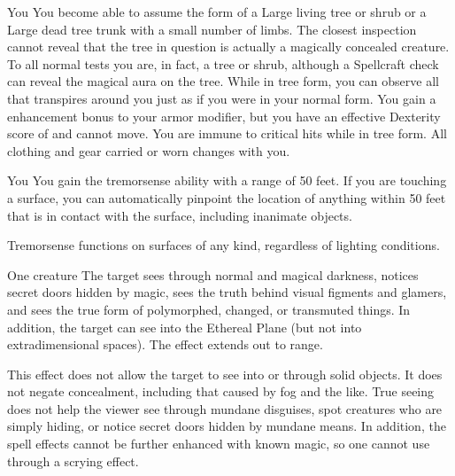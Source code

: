 \spelldur{\durext \dismissable}
\begin{spelltarget}{You}
    \spelleffect You become able to assume the form of a Large living tree or shrub or a Large dead tree trunk with a small number of limbs. The closest inspection cannot reveal that the tree in question is actually a magically concealed creature. To all normal tests you are, in fact, a tree or shrub, although a Spellcraft check can reveal the magical aura on the tree. While in tree form, you can observe all that transpires around you just as if you were in your normal form. You gain a  enhancement bonus to your armor modifier, but you have an effective Dexterity score of  and cannot move. You are immune to critical hits while in tree form. All clothing and gear carried or worn changes with you.
\end{spelltarget}

\begin{spelltarget}{You}
    \spelleffect You gain the tremorsense ability with a range of 50 feet. If you are touching a surface, you can automatically pinpoint the location of anything within 50 feet that is in contact with the surface, including inanimate objects.
\end{spelltarget}
\spellnotes Tremorsense functions on surfaces of any kind, regardless of lighting conditions.

\spelldur{\durshort}
\begin{spelltarget}{One creature}
    \spelleffect The target sees through normal and magical darkness, notices secret doors hidden by magic, sees the truth behind visual figments and glamers, and sees the true form of polymorphed, changed, or transmuted things. In addition, the target can see into the Ethereal Plane (but not into extradimensional spaces). The effect extends out to \rngmed range.
\end{spelltarget}
\spellnotes This effect does not allow the target to see into or through solid objects. It does not negate concealment, including that caused by fog and the like. True seeing does not help the viewer see through mundane disguises, spot creatures who are simply hiding, or notice secret doors hidden by mundane means. In addition, the spell effects cannot be further enhanced with known magic, so one cannot use  through a scrying effect.

